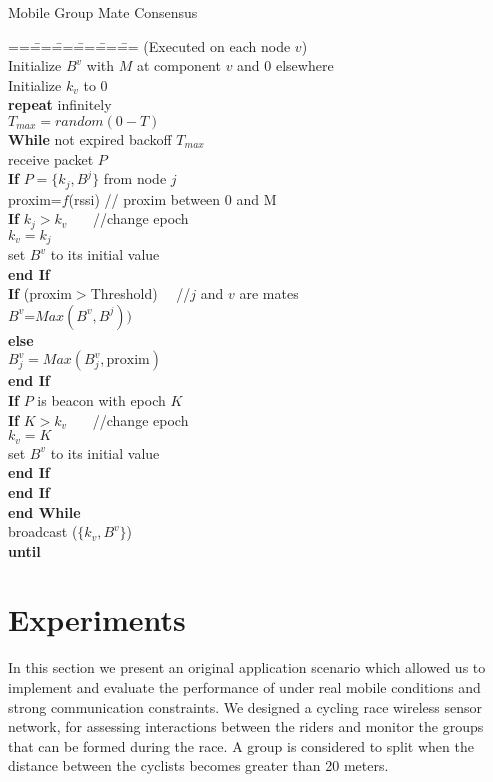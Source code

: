 \documentclass{sig-alternate}
\begin{document}
\begin{algorithm}
\label{algo3}
{\sc Mobile Group Mate Consensus}
\begin{tabbing}
==\= ==\= ==\= ==\= ==\= ==\kill
(Executed on each node $v$)\+ \\
Initialize $B^v$ with $M$ at component $v$ and 0 elsewhere\\
Initialize $k_v$ to 0\\
{\bf repeat} infinitely\+\\
$T_{max}=random(0-T)$\\
{\bf While}  not expired backoff $T_{max}$ \+ \\
receive packet $P$\\
{\bf If} $P=\{k_j,B^j\}$ from node $j$ \+\\
proxim=$f$({\sc rssi})  // proxim between 0 and M\\
{\bf If} $k_j>k_v$\+ \ \ \ //change epoch\\
$k_v = k_j$\\
set $B^v$ to its initial value \-\\
{\bf end If}\\
{\bf If} (proxim$>$Threshold)  \ \ //$j$ and $v$ are mates\+ \\
$B^v$=$Max(B^v,B^j))$\-\\
{\bf else} \+\\
$B^v_j = Max(B^v_j, \mbox{proxim})$\- \\

{\bf end If}\-\\
{\bf If} $P$ is beacon with epoch $K$\+\\
{\bf If} $K>k_v$\+ \ \ \ //change epoch\\
$k_v = K$\\
set $B^v$ to its initial value \-\\
{\bf end If}\-\\
{\bf end If}\-\\
{\bf end While}\\
broadcast ($\{k_v,B^v\}$)\-\\
{\bf until}  \\
\end{tabbing}
\end{algorithm}

\section{Experiments}
\label{sec-Exp}
In this section we present an original application scenario which allowed us to implement and evaluate the performance of {\mgmc} under real mobile conditions and strong communication constraints. We designed a cycling race wireless sensor network, for assessing interactions between the riders and monitor the groups that can be formed during the race. A group is considered to split when the distance between the cyclists becomes greater than 20 meters.
\end{document}
